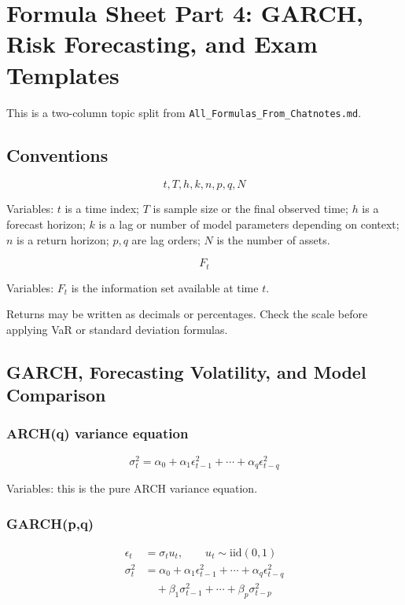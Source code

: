 \documentclass[
  8pt,
  twocolumn]{extarticle}
\author{}
\date{}
\begin{document}
\section{Formula Sheet Part 4: GARCH, Risk Forecasting, and Exam
Templates}\label{formula-sheet-part-4-garch-risk-forecasting-and-exam-templates}

This is a two-column topic split from
\texttt{All\_Formulas\_From\_Chatnotes.md}.

\subsection{Conventions}\label{conventions}

\[
t,T,h,k,n,p,q,N
\]

Variables: \(t\) is a time index; \(T\) is sample size or the final
observed time; \(h\) is a forecast horizon; \(k\) is a lag or number of
model parameters depending on context; \(n\) is a return horizon;
\(p,q\) are lag orders; \(N\) is the number of assets.

\[
F_t
\]

Variables: \(F_t\) is the information set available at time \(t\).

Returns may be written as decimals or percentages. Check the scale
before applying VaR or standard deviation formulas.

\subsection{GARCH, Forecasting Volatility, and Model
Comparison}\label{garch-forecasting-volatility-and-model-comparison}

\subsubsection{ARCH(q) variance equation}\label{archq-variance-equation}

\[
\sigma_t^2=\alpha_0+\alpha_1\epsilon_{t-1}^2+\cdots+\alpha_q\epsilon_{t-q}^2
\]

Variables: this is the pure ARCH variance equation.

\subsubsection{GARCH(p,q)}\label{garchpq}

\[
\begin{aligned}
\epsilon_t&=\sigma_tu_t,\qquad u_t\sim\mathrm{iid}(0,1)\\
\sigma_t^2&=\alpha_0+\alpha_1\epsilon_{t-1}^2+\cdots+\alpha_q\epsilon_{t-q}^2\\
&\quad+\beta_1\sigma_{t-1}^2+\cdots+\beta_p\sigma_{t-p}^2
\end{aligned}
\]
\end{document}
